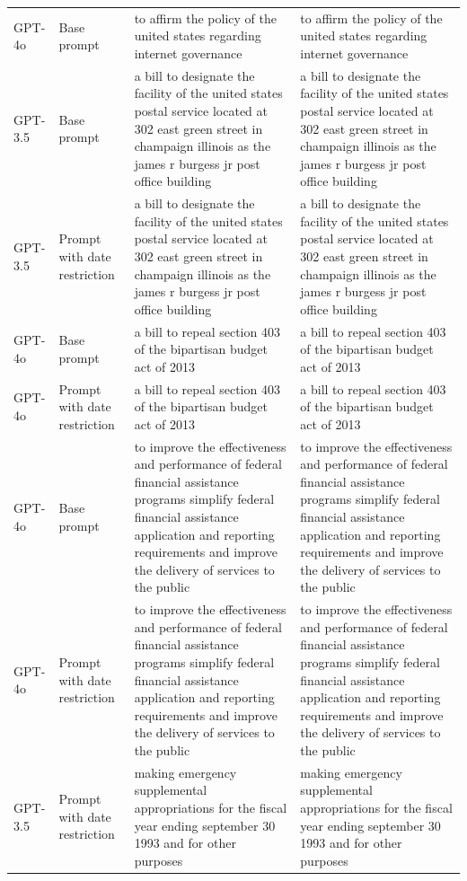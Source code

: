 \begin{longtable}{>{\raggedright\arraybackslash}p{1.4cm}>{\raggedright\arraybackslash}p{1.4cm}>{\raggedright\arraybackslash}p{5.5cm}>{\raggedright\arraybackslash}p{5.5cm}}
GPT-4o & Base prompt & to affirm the policy of the united states regarding internet governance & to affirm the policy of the united states regarding internet governance\\
GPT-3.5 & Base prompt & a bill to designate the facility of the united states postal service located at 302 east green street in champaign illinois as the james r burgess jr post office building & a bill to designate the facility of the united states postal service located at 302 east green street in champaign illinois as the james r burgess jr post office building\\
GPT-3.5 & Prompt with date restriction & a bill to designate the facility of the united states postal service located at 302 east green street in champaign illinois as the james r burgess jr post office building & a bill to designate the facility of the united states postal service located at 302 east green street in champaign illinois as the james r burgess jr post office building\\
GPT-4o & Base prompt & a bill to repeal section 403 of the bipartisan budget act of 2013 & a bill to repeal section 403 of the bipartisan budget act of 2013\\
GPT-4o & Prompt with date restriction & a bill to repeal section 403 of the bipartisan budget act of 2013 & a bill to repeal section 403 of the bipartisan budget act of 2013\\
GPT-4o & Base prompt & to improve the effectiveness and performance of federal financial assistance programs simplify federal financial assistance application and reporting requirements and improve the delivery of services to the public & to improve the effectiveness and performance of federal financial assistance programs simplify federal financial assistance application and reporting requirements and improve the delivery of services to the public\\
GPT-4o & Prompt with date restriction & to improve the effectiveness and performance of federal financial assistance programs simplify federal financial assistance application and reporting requirements and improve the delivery of services to the public & to improve the effectiveness and performance of federal financial assistance programs simplify federal financial assistance application and reporting requirements and improve the delivery of services to the public\\
GPT-3.5 & Prompt with date restriction & making emergency supplemental appropriations for the fiscal year ending september 30 1993 and for other purposes & making emergency supplemental appropriations for the fiscal year ending september 30 1993 and for other purposes\\

\end{longtable}
